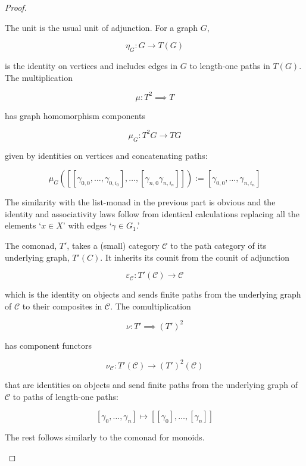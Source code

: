 \documentclass[11pt]{amsart}
\theoremstyle{plain}
\theoremstyle{definition}
\newcommand{\vep}{\varepsilon}
\newcommand{\cC}{{\mathcal C}}
\newcommand{\noi}{{\noindent}}
\begin{document}
\begin{proof}
\begin{enumerate}
        \noi The unit is the usual unit of adjunction. For a graph $G$, 
        
        \[ \eta_G : G \to T(G)\] 
        
        \noi is the identity on vertices and includes edges in $G$ to length-one paths in $T(G)$. The multiplication 
        
        \[ \mu : T^2 \implies T\]

        \noi has graph homomorphism components 

        \[ \mu_G : T^2 G \to T G \]

        \noi given by identities on vertices and concatenating paths:
        
        \[ \mu_G ([[\gamma_{0,0}, \dots , \gamma_{0,i_0}] , \dots , [\gamma_{n,0} \gamma_{n,i_n}]]) := [\gamma_{0,0}, \dots , \gamma_{n,i_n}]\]
        
        \noi The similarity with the list-monad in the previous part is obvious and the identity and associativity laws follow from identical calculations replacing all the elements `$x \in X$' with edges `$\gamma \in G_1$.' \medskip 

        The comonad, $T'$, takes a (small) category $\cC$ to the path category of its underlying graph, $T'(C)$. It inherits its counit from the counit of adjunction 

        \[ \vep_\cC : T'(\cC) \to \cC \]

        \noi which is the identity on objects and sends finite paths from the underlying graph of $\cC$ to their composites in $\cC$. The comultiplication 

        \[ \nu :  T' \implies (T')^2 \]

        \noi has component functors
        
        \[ \nu_\cC :  T'(\cC) \to (T')^2 (\cC )\]
        
        \noi that are identities on objects and send finite paths from the underlying graph of $\cC$ to paths of length-one paths: 

        \[ [\gamma_0, \dots , \gamma_n ] \mapsto [[\gamma_0] , \dots , [\gamma_n]]\]

        \noi The rest follows similarly to the comonad for monoids.
    \end{enumerate}
    \end{proof}
\end{document}
